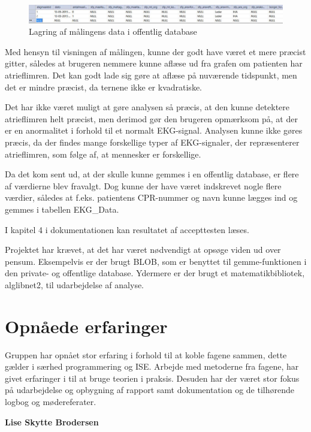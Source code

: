 \begin{figure}[H]
	\centering
	\includegraphics[width=1\textwidth]{Figurer/Snip20150525_29}
	\caption{Lagring af målingens data i offentlig database}
\end{figure}

Med hensyn til visningen af målingen, kunne der godt have været et mere præcist gitter, således at brugeren nemmere kunne aflæse ud fra grafen om patienten har atrieflimren. Det kan godt lade sig gøre at aflæse på nuværende tidspunkt, men det er mindre præcist, da ternene ikke er kvadratiske.

Det har ikke været muligt at gøre analysen så præcis, at den kunne detektere atrieflimren helt præcist, men derimod gør den brugeren opmærksom på, at der er en anormalitet i forhold til et normalt EKG-signal. Analysen kunne ikke gøres præcis, da der findes mange forskellige typer af EKG-signaler, der repræsenterer atrieflimren, som følge af, at mennesker er forskellige.

Da det kom sent ud, at der skulle kunne gemmes i en offentlig database, er flere af værdierne blev fravalgt. Dog kunne der have været indskrevet nogle flere værdier, således at f.eks. patientens CPR-nummer og navn kunne lægges ind og gemmes i tabellen EKG\_Data.

I kapitel 4 i dokumentationen kan resultatet af accepttesten læses.

Projektet har krævet, at det har været nødvendigt at opsøge viden ud over pensum. Eksempelvis er der brugt BLOB, som er benyttet til gemme-funktionen i den private- og offentlige database. Ydermere er der brugt et matematikbibliotek, alglibnet2, til udarbejdelse af analyse.

\section{Opnåede erfaringer}
Gruppen har opnået stor erfaring i forhold til at koble fagene sammen, dette gælder i særhed programmering og ISE. Arbejde med metoderne fra fagene, har givet erfaringer i til at bruge teorien i praksis. Desuden har der været stor fokus på udarbejdelse og opbygning af rapport samt dokumentation og de tilhørende logbog og mødereferater. 

\textbf{Lise Skytte Brodersen}\\

